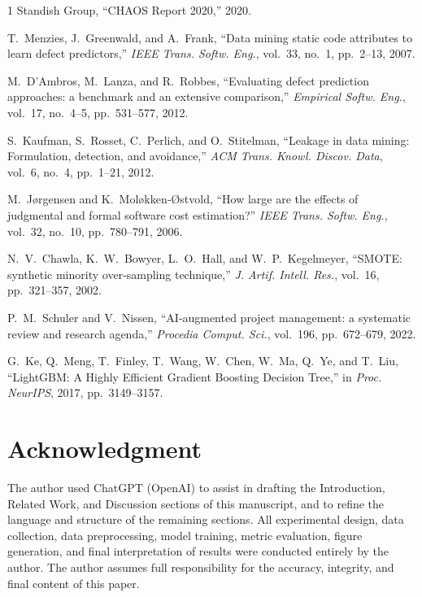 \documentclass[conference]{IEEEtran}
\begin{document}
\begin{thebibliography}{1}
Standish Group, ``CHAOS Report 2020,'' 2020.

T.~Menzies, J.~Greenwald, and A.~Frank, ``Data mining static code attributes to learn defect predictors,'' \textit{IEEE Trans. Softw. Eng.}, vol.~33, no.~1, pp.~2--13, 2007.

M.~D'Ambros, M.~Lanza, and R.~Robbes, ``Evaluating defect prediction approaches: a benchmark and an extensive comparison,'' \textit{Empirical Softw. Eng.}, vol.~17, no.~4--5, pp.~531--577, 2012.

S.~Kaufman, S.~Rosset, C.~Perlich, and O.~Stitelman, ``Leakage in data mining: Formulation, detection, and avoidance,'' \textit{ACM Trans. Knowl. Discov. Data}, vol.~6, no.~4, pp.~1--21, 2012.

M.~Jørgensen and K.~Moløkken‑Østvold, ``How large are the effects of judgmental and formal software cost estimation?'' \textit{IEEE Trans. Softw. Eng.}, vol.~32, no.~10, pp.~780--791, 2006.

N.~V.~Chawla, K.~W.~Bowyer, L.~O.~Hall, and W.~P.~Kegelmeyer, ``SMOTE: synthetic minority over‑sampling technique,'' \textit{J. Artif. Intell. Res.}, vol.~16, pp.~321--357, 2002.

P.~M.~Schuler and V.~Nissen, ``AI‑augmented project management: a systematic review and research agenda,'' \textit{Procedia Comput. Sci.}, vol.~196, pp.~672--679, 2022.

G.~Ke, Q.~Meng, T.~Finley, T.~Wang, W.~Chen, W.~Ma, Q.~Ye, and T.~Liu, ``LightGBM: A Highly Efficient Gradient Boosting Decision Tree,'' in \textit{Proc. NeurIPS}, 2017, pp.~3149--3157.
\end{thebibliography}

\section*{Acknowledgment}
The author used ChatGPT (OpenAI) to assist in drafting the Introduction, Related Work, and Discussion sections of this manuscript, and to refine the language and structure of the remaining sections. All experimental design, data collection, data preprocessing, model training, metric evaluation, figure generation, and final interpretation of results were conducted entirely by the author. The author assumes full responsibility for the accuracy, integrity, and final content of this paper.
\end{document}
